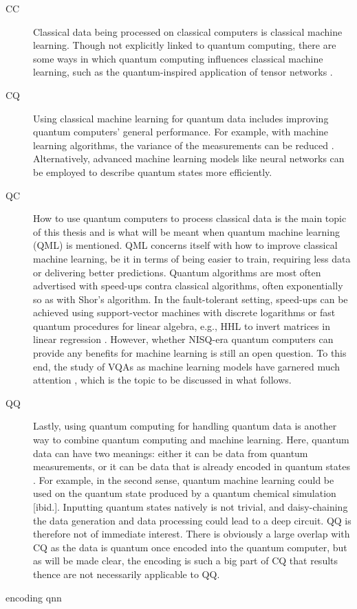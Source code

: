 \begin{description}
    \item[CC]
        Classical data being processed on classical computers is classical machine learning.
        Though not explicitly linked to quantum computing, there are some ways in which quantum computing influences classical machine learning, such as the quantum-inspired application of tensor networks \cite{felser2021}.

    \item[CQ]
        Using classical machine learning for quantum data includes improving quantum computers' general performance.
        For example, with machine learning algorithms, the variance of the measurements can be reduced \cite{torlai2020}.
        Alternatively, advanced machine learning models like neural networks can be employed to describe quantum states more efficiently.


    \item[QC]
        How to use quantum computers to process classical data is the main topic of this thesis and is what will be meant when quantum machine learning (QML) is mentioned.
        QML concerns itself with how to improve classical machine learning, be it in terms of being easier to train, requiring less data or delivering better predictions.
        Quantum algorithms are most often advertised with speed-ups contra classical algorithms, often exponentially so as with Shor's algorithm.
        In the fault-tolerant setting, speed-ups can be achieved using support-vector machines with discrete logarithms \cite{liu2021} or fast quantum procedures for linear algebra, e.g., HHL to invert matrices in linear regression \cite{wiebe2012}.
        However, whether NISQ-era quantum computers can provide any benefits for machine learning is still an open question.
        To this end, the study of VQAs as machine learning models have garnered much attention \cite{benedetti2019}, which is the topic to be discussed in what follows.

    \item[QQ]
        Lastly, using quantum computing for handling quantum data is another way to combine quantum computing and machine learning.
        Here, quantum data can have two meanings: either it can be data from quantum measurements, or it can be data that is already encoded in quantum states \cite{schuld2021a}.
        For example, in the second sense, quantum machine learning could be used on the quantum state produced by a quantum chemical simulation [ibid.].
        Inputting quantum states natively is not trivial, and daisy-chaining the data generation and data processing could lead to a deep circuit.
        QQ is therefore not of immediate interest.
        There is obviously a large overlap with CQ as the data is quantum once encoded into the quantum computer, but as will be made clear, the encoding is such a big part of CQ that results thence are not necessarily applicable to QQ.

\end{description}



{encoding}
{qnn}
